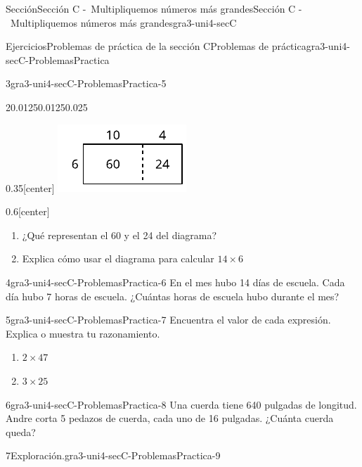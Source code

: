 \documentclass[twoside,10pt,]{article}
\begin{document}
\begin{sectionptx}{Sección}{Sección C -~Multipliquemos números más grandes}{}{Sección C -~Multipliquemos números más grandes}{}{}{gra3-uni4-secC}
\begin{exercises-subsection}{Ejercicios}{Problemas de práctica de la sección C}{}{Problemas de práctica}{}{}{gra3-uni4-secC-ProblemasPractica}
\begin{divisionexercise}{3}{}{}{gra3-uni4-secC-ProblemasPractica-5}
\begin{sidebyside}{2}{0.0125}{0.0125}{0.025}
\begin{sbspanel}{0.35}[center]
\includegraphics[width=\linewidth]{external/svg-source/tikz-file-151678.pdf}
\end{sbspanel}%
\begin{sbspanel}{0.6}[center]%
%
\begin{enumerate}[label=(\alph*)]
\item{}¿Qué representan el 60 y el 24 del diagrama?%
\item{}Explica cómo usar el diagrama para calcular \(14 \times 6\)%
\end{enumerate}
\end{sbspanel}%
\end{sidebyside}%
\end{divisionexercise}%
\begin{divisionexercise}{4}{}{}{gra3-uni4-secC-ProblemasPractica-6}%
En el mes hubo 14 días de escuela. Cada día hubo 7 horas de escuela. ¿Cuántas horas de escuela hubo durante el mes?%
\end{divisionexercise}%
\begin{divisionexercise}{5}{}{}{gra3-uni4-secC-ProblemasPractica-7}%
Encuentra el valor de cada expresión. Explica o muestra tu razonamiento.%
%
\begin{enumerate}[label=(\alph*)]
\item{}\(\displaystyle 2 \times 47\)%
\item{}\(\displaystyle 3 \times 25\)%
\end{enumerate}
\end{divisionexercise}%
\begin{divisionexercise}{6}{}{}{gra3-uni4-secC-ProblemasPractica-8}%
Una cuerda tiene 640 pulgadas de longitud. Andre corta 5 pedazos de cuerda, cada uno de 16 pulgadas. ¿Cuánta cuerda queda?%
\end{divisionexercise}%
\begin{divisionexercise}{7}{Exploración.}{}{gra3-uni4-secC-ProblemasPractica-9}%

\end{divisionexercise}
\end{exercises-subsection}
\end{sectionptx}
\end{document}
